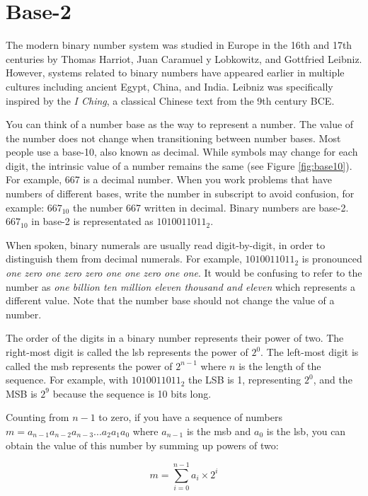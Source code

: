 \section{Base-2\label{sec:data:bases}}

The modern binary number system was studied in Europe in the 16th and 17th centuries by Thomas 
Harriot, Juan Caramuel y Lobkowitz, and Gottfried Leibniz. However, systems related to binary 
numbers have appeared earlier in multiple cultures including ancient Egypt, China, and India. 
Leibniz was specifically inspired by the \textit{I Ching}, a classical Chinese text from the 9th century BCE. 

You can think of a number base as the way to represent a number. The value of the number does not 
change when transitioning between number bases. Most people use a \gls{base-10}, also known as decimal.
While symbols may change for each digit, the intrinsic value of a number remains the same (see Figure \ref{fig:base10}). 
For example, 667 is a decimal number. When you work problems that have numbers of different bases, 
write the number in subscript to avoid confusion, for example: $667_{10}$ the number 667 written in 
decimal. Binary numbers are \gls{base-2}. $667_{10}$ in \gls{base-2} is representated as $1010011011_2$. 

When spoken, binary numerals are usually read digit-by-digit, in order to distinguish them from 
decimal numerals. For example, $1010011011_2$ is pronounced \textit{one zero one zero zero one 
one zero one one}. It would be confusing to refer to the number as \textit{one billion ten million 
eleven thousand and eleven} which represents a different value. Note that the number base should 
not change the value of a number.

The order of the digits in a binary number represents their power of two. The right-most digit is 
called the \gls{lsb} represents the power of $2^0$. The left-most digit is called 
the \gls{msb} represents the power of $2^{n-1}$ where $n$ is the length of the 
sequence. For example, with $1010011011_2$ the LSB is 1, representing $2^0$, and the MSB is $2^9$ 
because the sequence is 10 bits long. 

Counting from $n-1$ to zero, if you have a sequence of numbers $m = a_{n-1}a_{n-2}a_{n-3}...a_2a_1a_0$ 
where $a_{n-1}$ is the \gls{msb} and $a_0$ is the \gls{lsb}, you can obtain the value of this number 
by summing up powers of two:

\begin{equation}\label{eq:base2}
    m = \sum_{i=0}^{n-1} a_i \times 2^i
\end{equation}


